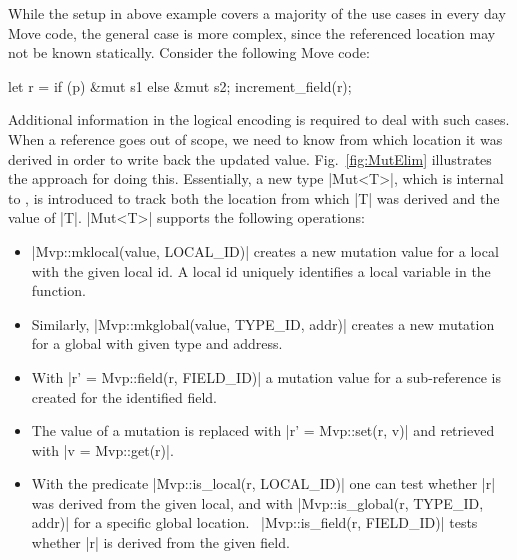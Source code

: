 
While the setup in above example covers a majority of the use cases in every day
Move code,
the general case is more complex, since the referenced location may not be known
statically.
Consider the following Move code:

\begin{Move}
  let r = if (p) &mut s1 else &mut s2;
  increment_field(r);
\end{Move}

\noindent Additional information in the logical encoding is required to deal
with such cases.
When a reference goes out of scope, we need to know
from which location it was derived in order to write back the updated value.
%
Fig.~\ref{fig:MutElim} illustrates the approach for doing this.
%
Essentially, a new type |Mut<T>|, which is internal to \MVP, is introduced to
track both the location from which |T| was derived and the value of |T|.
%
|Mut<T>| supports the following operations:

\begin{itemize}
\item |Mvp::mklocal(value, LOCAL_ID)| creates a new mutation value for a local
  with the given local id.  A local id uniquely identifies a local variable
  in the function.
\item Similarly, |Mvp::mkglobal(value, TYPE_ID, addr)| creates a new
  mutation for a global with given type and address.
\item With |r' = Mvp::field(r, FIELD_ID)| a mutation value for a sub-reference is
  created for the identified field.
\item The value of a mutation is replaced with |r' = Mvp::set(r, v)| and
  retrieved with |v = Mvp::get(r)|.
\item With the predicate |Mvp::is_local(r, LOCAL_ID)| one can test whether |r|
  was derived from the given local, and with |Mvp::is_global(r, TYPE_ID, addr)|
  for a specific global location.~%
  |Mvp::is_field(r, FIELD_ID)| tests whether |r| is derived from the given field.
\end{itemize}

